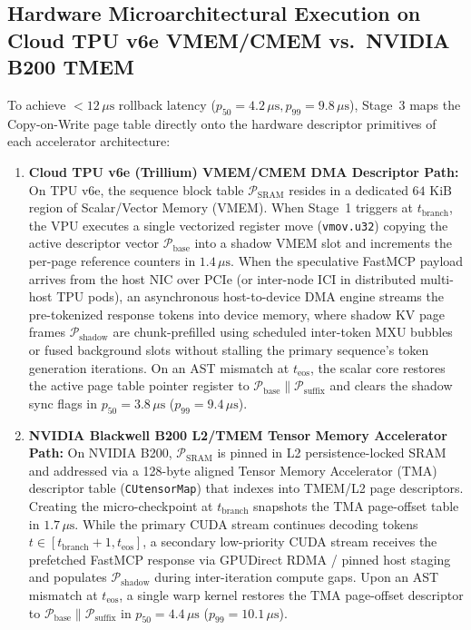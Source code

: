 \documentclass[10pt,conference]{IEEEtran}
\begin{document}
\subsection{Hardware Microarchitectural Execution on Cloud TPU v6e VMEM/CMEM vs.\ NVIDIA B200 TMEM}
To achieve $< 12\,\mu\text{s}$ rollback latency ($p_{50} = 4.2\,\mu\text{s}, p_{99} = 9.8\,\mu\text{s}$), Stage~3 maps the Copy-on-Write page table directly onto the hardware descriptor primitives of each accelerator architecture:
\begin{enumerate}
    \item \textbf{Cloud TPU v6e (Trillium) VMEM/CMEM DMA Descriptor Path:} On TPU v6e, the sequence block table $\mathcal{P}_{\text{SRAM}}$ resides in a dedicated $64\text{ KiB}$ region of Scalar/Vector Memory (VMEM). When Stage~1 triggers at $t_{\text{branch}}$, the VPU executes a single vectorized register move (\texttt{vmov.u32}) copying the active descriptor vector $\mathcal{P}_{\text{base}}$ into a shadow VMEM slot and increments the per-page reference counters in $1.4\,\mu\text{s}$. When the speculative FastMCP payload arrives from the host NIC over PCIe (or inter-node ICI in distributed multi-host TPU pods), an asynchronous host-to-device DMA engine streams the pre-tokenized response tokens into device memory, where shadow KV page frames $\mathcal{P}_{\text{shadow}}$ are chunk-prefilled using scheduled inter-token MXU bubbles or fused background slots without stalling the primary sequence's token generation iterations. On an AST mismatch at $t_{\text{eos}}$, the scalar core restores the active page table pointer register to $\mathcal{P}_{\text{base}} \parallel \mathcal{P}_{\text{suffix}}$ and clears the shadow sync flags in $p_{50} = 3.8\,\mu\text{s}$ ($p_{99} = 9.4\,\mu\text{s}$).
    \item \textbf{NVIDIA Blackwell B200 L2/TMEM Tensor Memory Accelerator Path:} On NVIDIA B200, $\mathcal{P}_{\text{SRAM}}$ is pinned in L2 persistence-locked SRAM and addressed via a 128-byte aligned Tensor Memory Accelerator (TMA) descriptor table (\texttt{CUtensorMap}) that indexes into TMEM/L2 page descriptors. Creating the micro-checkpoint at $t_{\text{branch}}$ snapshots the TMA page-offset table in $1.7\,\mu\text{s}$. While the primary CUDA stream continues decoding tokens $t \in [t_{\text{branch}}+1, t_{\text{eos}}]$, a secondary low-priority CUDA stream receives the prefetched FastMCP response via GPUDirect RDMA / pinned host staging and populates $\mathcal{P}_{\text{shadow}}$ during inter-iteration compute gaps. Upon an AST mismatch at $t_{\text{eos}}$, a single warp kernel restores the TMA page-offset descriptor to $\mathcal{P}_{\text{base}} \parallel \mathcal{P}_{\text{suffix}}$ in $p_{50} = 4.4\,\mu\text{s}$ ($p_{99} = 10.1\,\mu\text{s}$).
\end{enumerate}
\end{document}
